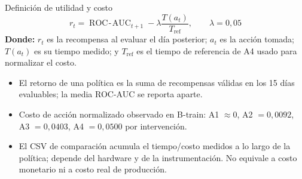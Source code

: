 \documentclass[aspectratio=169,10pt]{beamer}
\begin{document}
\begin{frame}{Definición de utilidad y costo}
\begin{equation*}
  r_t = \operatorname{ROC\!-\!AUC}_{t+1}
        - \lambda \frac{T(a_t)}{T_{\mathrm{ref}}},
  \qquad \lambda=0{,}05
\end{equation*}
\textbf{Donde:} \(r_t\) es la recompensa al evaluar el día posterior;
\(a_t\) es la acción tomada; \(T(a_t)\) es su tiempo medido; y
\(T_{\mathrm{ref}}\) es el tiempo de referencia de A4 usado para normalizar
el costo.

\vspace{0.3em}
\begin{itemize}
  \item El retorno de una política es la suma de recompensas válidas en los
        15 días evaluables; la media ROC-AUC se reporta aparte.
  \item Costo de acción normalizado observado en B-train:
        A1 \(\approx 0\), A2 \(=0{,}0092\), A3 \(=0{,}0403\),
        A4 \(=0{,}0500\) por intervención.
  \item El CSV de comparación acumula el tiempo/costo medidos a lo largo de la
        política; depende del hardware y de la instrumentación. No equivale a
        costo monetario ni a costo real de producción.
\end{itemize}
\end{frame}
\end{document}
